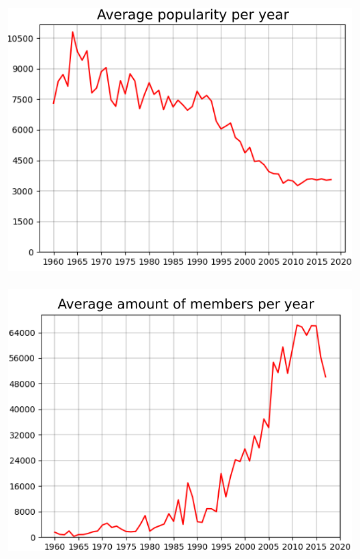 \begin{frame}
\begin{figure}
\begin{subfigure}{.45\columnwidth}
		\centering
		\includegraphics[width=\columnwidth]{graphics/avgPopularities.png}
	\end{subfigure}%
	\begin{subfigure}{.45\columnwidth}
		\centering
		\includegraphics[width=\columnwidth]{graphics/avgMembers.png}
	\end{subfigure}
\end{figure}
\end{frame}

